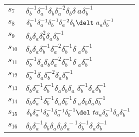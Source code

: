 \documentclass{article}
\begin{document}
\begin{center}
\begin{tabular}{ll}
$s_{7}$ & $\delta_b^{-1}\delta_a^{-1}\delta_b^{}\delta_a^{-2}\delta_b^{}\delta_\
a^{}\delta_b^{-1}$ \\
$s_{8}$ & $\delta_b^{-1}\delta_a^{-1}\delta_b^{-1}\delta_a^{-2}\delta_b^{}\delt\
a_a^{}\delta_b^{-1}$ \\
$s_{9}$ & $\delta_b^{}\delta_a^{}\delta_b^{2}\delta_a^{}\delta_b^{-1}$ \\
$s_{10}$ & $\delta_b^{}\delta_a^{}\delta_b^{-1}\delta_a^{-2}\delta_b^{-1}\delta\
_a^{}\delta_b^{-1}$ \\
$s_{11}$ & $\delta_b^{-1}\delta_a^{}\delta_b^{}\delta_a^{-2}\delta_b^{-1}\delta\
_a^{}\delta_b^{-1}$ \\
$s_{12}$ & $\delta_b^{-1}\delta_a^{}\delta_b^{-2}\delta_a^{}\delta_b^{-1}$ \\
$s_{13}$ & $\delta_b^{}\delta_a^{-1}\delta_b^{-1}\delta_a^{}\delta_b^{}\delta_a\
^{}\delta_b^{-1}\delta_a^{}\delta_b^{-1}$ \\
$s_{14}$ & $\delta_b^{}\delta_a^{-1}\delta_b^{-1}\delta_a^{}\delta_b^{-1}\delta\
_a^{}\delta_b^{}\delta_a^{}\delta_b^{-1}$ \\
$s_{15}$ & $\delta_b^{}\delta_a^{-1}\delta_b^{-1}\delta_a^{-1}\delta_b^{-1}\del\
ta_a^{}\delta_b^{-1}\delta_a^{}\delta_b^{-1}$ \\
$s_{16}$ & $\delta_b^{}\delta_a^{-1}\delta_b^{}\delta_a^{}\delta_b^{}\delta_a^{\
-1}\delta_b^{-1}\delta_a^{}\delta_b^{-1}$ \\
\bottomrule
\end{tabular}
\end{center}

\thispagestyle{empty}
\end{document}
